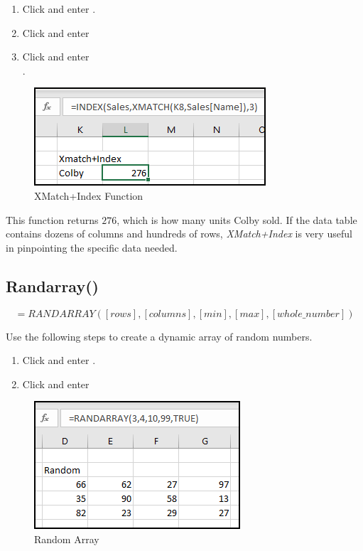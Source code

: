 \begin{enumbox}
	\begin{enumerate}
		\item Click  and enter .
		\item Click  and enter 
		\item Click  and enter \\ .
	\end{enumerate}
\end{enumbox}

\begin{figure}[H]
	\centering
	\includegraphics[width=\maxwidth{.65\linewidth}]{gfx/apb_fig07}
	\caption{XMatch+Index Function}
	\label{apb:fig07}
\end{figure}

This function returns $ 276 $, which is how many units Colby sold. If the data table contains dozens of columns and hundreds of rows, \textit{XMatch+Index} is very useful in pinpointing the specific data needed.

\subsection{Randarray()}

\[ =RANDARRAY([rows],[columns],[min],[max],[whole\_number]) \]

Use the following steps to create a dynamic array of random numbers.

\begin{enumbox}
	\begin{enumerate}
		\item Click  and enter .
		\item Click  and enter 
	\end{enumerate}
\end{enumbox}

\begin{figure}[H]
	\centering
	\includegraphics[width=\maxwidth{.65\linewidth}]{gfx/apb_fig08}
	\caption{Random Array}
	\label{apb:fig08}
\end{figure}

